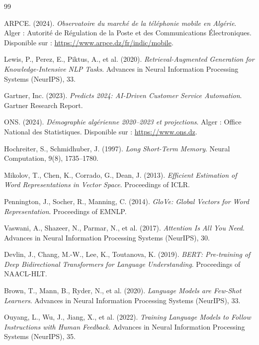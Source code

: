 \documentclass[12pt, a4paper]{report}
\begin{document}
\begin{thebibliography}{99}

ARPCE. (2024). \textit{Observatoire du marché de la téléphonie mobile en Algérie}. Alger : Autorité de Régulation de la Poste et des Communications Électroniques. Disponible sur : \url{https://www.arpce.dz/fr/indic/mobile}.

Lewis, P., Perez, E., Piktus, A., et al. (2020). \textit{Retrieval-Augmented Generation for Knowledge-Intensive NLP Tasks}. Advances in Neural Information Processing Systems (NeurIPS), 33.

Gartner, Inc. (2023). \textit{Predicts 2024: AI-Driven Customer Service Automation}. Gartner Research Report.

ONS. (2024). \textit{Démographie algérienne 2020--2023 et projections}. Alger : Office National des Statistiques. Disponible sur : \url{https://www.ons.dz}.

Hochreiter, S., Schmidhuber, J. (1997). \textit{Long Short-Term Memory}. Neural Computation, 9(8), 1735--1780.

Mikolov, T., Chen, K., Corrado, G., Dean, J. (2013). \textit{Efficient Estimation of Word Representations in Vector Space}. Proceedings of ICLR.

Pennington, J., Socher, R., Manning, C. (2014). \textit{GloVe: Global Vectors for Word Representation}. Proceedings of EMNLP.

Vaswani, A., Shazeer, N., Parmar, N., et al. (2017). \textit{Attention Is All You Need}. Advances in Neural Information Processing Systems (NeurIPS), 30.

Devlin, J., Chang, M.-W., Lee, K., Toutanova, K. (2019). \textit{BERT: Pre-training of Deep Bidirectional Transformers for Language Understanding}. Proceedings of NAACL-HLT.

Brown, T., Mann, B., Ryder, N., et al. (2020). \textit{Language Models are Few-Shot Learners}. Advances in Neural Information Processing Systems (NeurIPS), 33.

Ouyang, L., Wu, J., Jiang, X., et al. (2022). \textit{Training Language Models to Follow Instructions with Human Feedback}. Advances in Neural Information Processing Systems (NeurIPS), 35.


\end{thebibliography}
\end{document}
